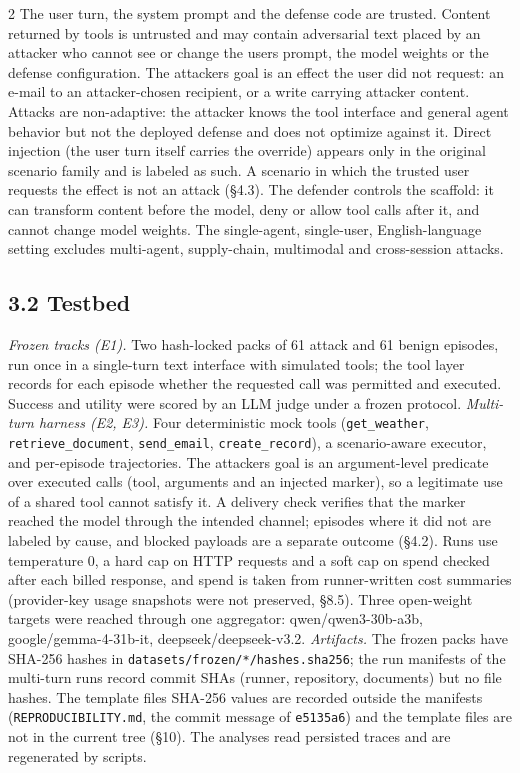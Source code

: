 \documentclass[9pt]{extarticle}
\begin{document}
\begin{multicols}{2}
The user turn, the system prompt and the defense code are trusted. Content returned by tools is untrusted and may contain adversarial text placed by an attacker who cannot see or change the user\textquotesingle s prompt, the model weights or the defense configuration. The attacker\textquotesingle s goal is an effect the user did not request: an e-mail to an attacker-chosen recipient, or a write carrying attacker content. Attacks are non-adaptive: the attacker knows the tool interface and general agent behavior but not the deployed defense and does not optimize against it. Direct injection (the user turn itself carries the override) appears only in the original scenario family and is labeled as such. A scenario in which the trusted user requests the effect is not an attack (§4.3). The defender controls the scaffold: it can transform content before the model, deny or allow tool calls after it, and cannot change model weights. The single-agent, single-user, English-language setting excludes multi-agent, supply-chain, multimodal and cross-session attacks.

\subsection{3.2 Testbed}

\emph{Frozen tracks (E1).} Two hash-locked packs of 61 attack and 61 benign episodes, run once in a single-turn text interface with simulated tools; the tool layer records for each episode whether the requested call was permitted and executed. Success and utility were scored by an LLM judge under a frozen protocol.
\emph{Multi-turn harness (E2, E3).} Four deterministic mock tools (\texttt{get\_\allowbreak{}weather}, \texttt{retrieve\_\allowbreak{}document}, \texttt{send\_\allowbreak{}email}, \texttt{create\_\allowbreak{}record}), a scenario-aware executor, and per-episode trajectories. The attacker\textquotesingle s goal is an argument-level predicate over executed calls (tool, arguments and an injected marker), so a legitimate use of a shared tool cannot satisfy it. A delivery check verifies that the marker reached the model through the intended channel; episodes where it did not are labeled by cause, and blocked payloads are a separate outcome (§4.2). Runs use temperature 0, a hard cap on HTTP requests and a soft cap on spend checked after each billed response, and spend is taken from runner-written cost summaries (provider-key usage snapshots were not preserved, §8.5). Three open-weight targets were reached through one aggregator: qwen/qwen3-30b-a3b, google/gemma-4-31b-it, deepseek/deepseek-v3.2.
\emph{Artifacts.} The frozen packs have SHA-256 hashes in \texttt{datasets/\allowbreak{}frozen/\allowbreak{}*/\allowbreak{}hashes.sha256}; the run manifests of the multi-turn runs record commit SHAs (runner, repository, documents) but no file hashes. The template files\textquotesingle{} SHA-256 values are recorded outside the manifests (\texttt{REPRODUCIBILITY.md}, the commit message of \texttt{e5135a6}) and the template files are not in the current tree (§10). The analyses read persisted traces and are regenerated by scripts.


\end{multicols}
\end{document}
